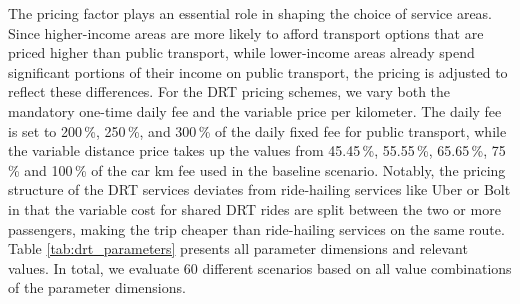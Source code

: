 \documentclass[main.tex]{subfiles}
\begin{document}
The pricing factor plays an essential role in shaping the choice of service areas. Since higher-income areas are more likely to afford transport options that are priced higher than public transport, while lower-income areas already spend significant portions of their income on public transport, the pricing is adjusted to reflect these differences. 
For the DRT pricing schemes, we vary both the mandatory one-time daily fee and the variable price per kilometer. The daily fee is set to 200\,\%, 250\,\%, and 300\,\% of the daily fixed fee for public transport, while the variable distance price takes up the values from 45.45\,\%, 55.55\,\%, 65.65\,\%, 75\,\% and 100\,\% of the car km fee used in the baseline scenario. Notably, the pricing structure of the DRT services deviates from ride-hailing services like Uber or Bolt in that the variable cost for shared DRT rides are split between the two or more passengers, making the trip cheaper than ride-hailing services on the same route. Table \ref{tab:drt_parameters} presents all parameter dimensions and relevant values. In total, we evaluate 60 different scenarios based on all value combinations of the parameter dimensions.\\

\begin{table}[h]
\centering
{}
\caption{Complete parameter grid for all 60 simulated DRT scenarios}
\label{tab:drt_parameters}
\end{table}
\end{document}
